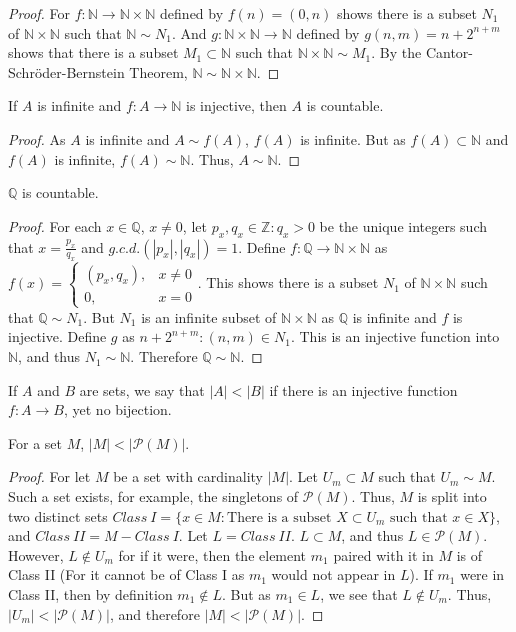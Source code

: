 \documentclass[crop=false,class=book]{standalone}
\begin{document}
\begin{proof}
For $f:\mathbb{N} \rightarrow \mathbb{N}\times \mathbb{N}$ defined by $f(n) = (0,n)$ shows there is a subset $N_1$ of $\mathbb{N} \times \mathbb{N}$ such that $\mathbb{N}\sim N_1$. And $g:\mathbb{N}\times \mathbb{N} \rightarrow \mathbb{N}$ defined by $g(n,m) =n+2^{n+m}$ shows that there is a subset $M_1 \subset \mathbb{N}$ such that $\mathbb{N} \times \mathbb{N} \sim M_1$. By the Cantor-Schr\"{o}der-Bernstein Theorem, $\mathbb{N} \sim \mathbb{N}\times \mathbb{N}$.
\end{proof}
\begin{lemma}
If $A$ is infinite and $f:A\rightarrow \mathbb{N}$ is injective, then $A$ is countable.
\end{lemma}
\begin{proof}
As $A$ is infinite and $A\sim f(A)$, $f(A)$ is infinite. But as $f(A)\subset \mathbb{N}$ and $f(A)$ is infinite, $f(A)\sim \mathbb{N}$. Thus, $A\sim \mathbb{N}$. 
\end{proof}
\begin{theorem}
$\mathbb{Q}$ is countable.
\end{theorem}
\begin{proof}
For each $x\in \mathbb{Q}$, $x\ne 0$, let $p_x,q_x\in\mathbb{Z}:q_x>0$ be the unique integers such that $x = \frac{p_x}{q_x}$ and $g.c.d.(|p_x|,|q_x|)=1$. Define $f:\mathbb{Q}\rightarrow \mathbb{N}\times \mathbb{N}$ as $f(x) = \begin{cases}(p_x,q_x), & x\ne 0 \\ 0, & x=0\end{cases}$. This shows there is a subset $N_1$ of $\mathbb{N}\times \mathbb{N}$ such that $\mathbb{Q}\sim N_1$. But $N_1$ is an infinite subset of $\mathbb{N}\times\mathbb{N}$ as $\mathbb{Q}$ is infinite and $f$ is injective. Define $g$ as $n+2^{n+m}:(n,m)\in N_1$. This is an injective function into $\mathbb{N}$, and thus $N_1 \sim \mathbb{N}$. Therefore $\mathbb{Q}\sim \mathbb{N}$.
\end{proof}
\begin{definition}
If $A$ and $B$ are sets, we say that $|A|<|B|$ if there is an injective function $f:A\rightarrow B$, yet no bijection.
\end{definition}
\begin{theorem}
For a set $M$, $|M|<|\mathcal{P}(M)|$.
\end{theorem}
\begin{proof}
For let $M$ be a set with cardinality $|M|$. Let $U_m \subset M$ such that $U_m \sim M$. Such a set exists, for example, the singletons of $\mathcal{P}(M)$. Thus, $M$ is split into two distinct sets $Class\ I=\{x\in M: \textrm{There is a subset } X\subset U_m\textrm{ such that }x\in X\}$, and $Class\ II=M-Class\ I$. Let $L = Class\ II$. $L\subset M$, and thus $L\in \mathcal{P}(M)$. However, $L \notin U_m$ for if it were, then the element $m_1$ paired with it in $M$ is of Class II (For it cannot be of Class I as $m_1$ would not appear in $L$). If $m_1$ were in Class II, then by definition $m_1 \notin L$. But as $m_1 \in L$, we see that $L\notin U_m$. Thus, $|U_m| <|\mathcal{P}(M)|$, and therefore $|M|<|\mathcal{P}(M)|$.
\end{proof}
\end{document}
